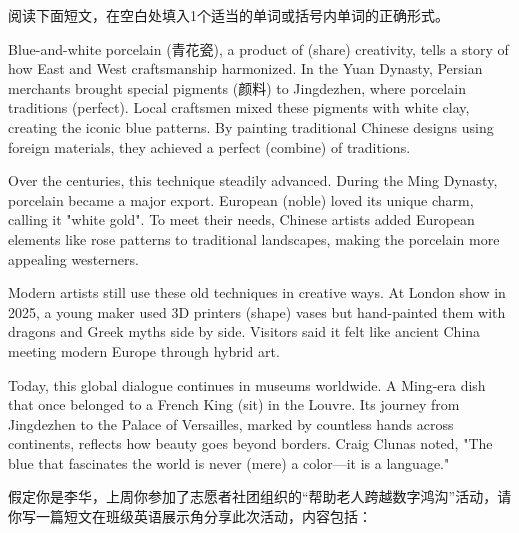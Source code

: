 \documentclass{英语试卷}
\begin{document}
\par 阅读下面短文，在空白处填入1个适当的单词或括号内单词的正确形式。\par
\par Blue-and-white porcelain (青花瓷), a product of (share) creativity, tells a story of how East and West craftsmanship harmonized. In the Yuan Dynasty, Persian merchants brought special pigments (颜料) to Jingdezhen, where porcelain traditions (perfect). Local craftsmen mixed these pigments with white clay, creating the iconic blue patterns. By painting traditional Chinese designs using foreign materials, they achieved a perfect (combine) of traditions.\par
\par Over the centuries, this technique steadily advanced. During the Ming Dynasty, porcelain became a major export. European  (noble) loved its unique charm, calling it "white gold". To meet their needs, Chinese artists added European elements like rose patterns to traditional landscapes, making the porcelain more appealing  westerners.\par
\par Modern artists still use these old techniques in creative ways. At  London show in 2025, a young maker used 3D printers  (shape) vases but hand-painted them with dragons and Greek myths side by side. Visitors said it felt like ancient China meeting modern Europe through hybrid art.\par
\par Today, this global dialogue continues in museums worldwide. A Ming-era dish that once belonged to a French King  (sit) in the Louvre. Its journey from Jingdezhen to the Palace of Versailles, marked by countless hands across continents, reflects how beauty goes beyond borders.  Craig Clunas noted, "The blue that fascinates the world is never  (mere) a color—it is a language."\par
{}
\par 假定你是李华，上周你参加了志愿者社团组织的“帮助老人跨越数字鸿沟”活动，请你写一篇短文在班级英语展示角分享此次活动，内容包括：\par
\end{document}
